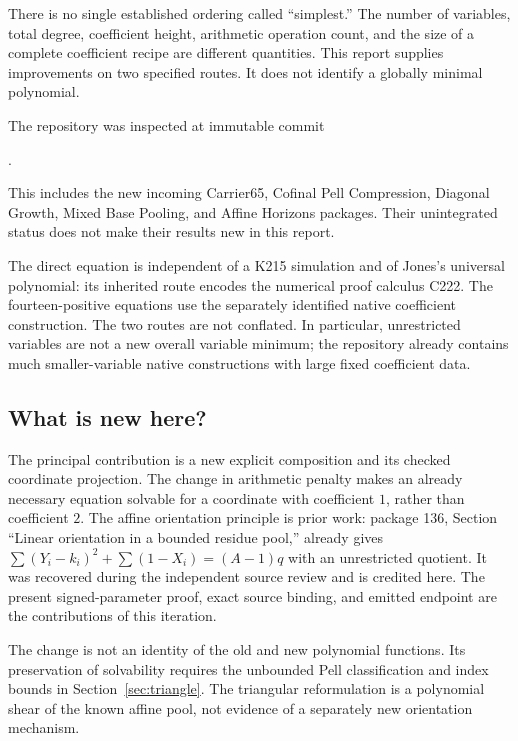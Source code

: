 \documentclass[11pt,letterpaper]{article}
\theoremstyle{definition}\newtheorem{definition}[theorem]{Definition}
\theoremstyle{remark}\newtheorem{remark}[theorem]{Remark}
\newcommand{\pathcode}[1]{\texttt{\detokenize{#1}}}
\begin{document}
There is no single established ordering called ``simplest.'' The number of variables, total degree, coefficient height, arithmetic operation count, and the size of a complete coefficient recipe are different quantities. This report supplies improvements on two specified routes. It does not identify a globally minimal polynomial.

The repository was inspected at immutable commit
\begin{center}\small\pathcode{cdfea7d90176775d74c1c30afbe49fa78ade9897}.\end{center}
This includes the new incoming Carrier65, Cofinal Pell Compression, Diagonal Growth, Mixed Base Pooling, and Affine Horizons packages. Their unintegrated status does not make their results new in this report.



The direct equation is independent of a K215 simulation and of Jones's universal polynomial: its inherited route encodes the numerical proof calculus C222. The fourteen-positive equations use the separately identified native coefficient construction. The two routes are not conflated. In particular, \DirectVars{} unrestricted variables are not a new overall variable minimum; the repository already contains much smaller-variable native constructions with large fixed coefficient data.

\subsection{What is new here?}
The principal contribution is a new explicit composition and its checked coordinate projection. The change in arithmetic penalty makes an already necessary equation solvable for a coordinate with coefficient $1$, rather than coefficient $2$. The affine orientation principle is prior work: package 136, Section ``Linear orientation in a bounded residue pool,'' already gives $\sum(Y_i-k_i)^2+\sum(1-X_i)=(A-1)q$ with an unrestricted quotient. It was recovered during the independent source review and is credited here. The present signed-parameter proof, exact source binding, and emitted endpoint are the contributions of this iteration.

The change is not an identity of the old and new polynomial functions. Its preservation of solvability requires the unbounded Pell classification and index bounds in Section~\ref{sec:triangle}. The triangular reformulation is a polynomial shear of the known affine pool, not evidence of a separately new orientation mechanism.
\end{document}
